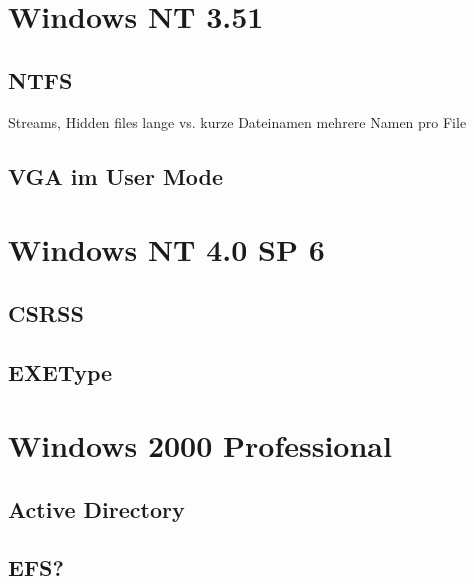 \section{Windows NT 3.51}

	\subsection{NTFS}
	Streams, Hidden files
	lange vs. kurze Dateinamen
	mehrere Namen pro File

	\subsection{VGA im User Mode}

\section{Windows NT 4.0 SP 6}

	\subsection{CSRSS}
	\subsection{EXEType}

\section{Windows 2000 Professional}

	\subsection{Active Directory}
	\subsection{EFS?}

